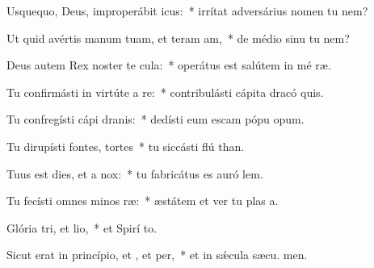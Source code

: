 \item Usquequo, Deus, improperábit icus:~* irrítat adversárius nomen tu  nem?
\item Ut quid avértis manum tuam, et teram am,~* de médio sinu tu  nem?
\item Deus autem Rex noster te cula:~* operátus est salútem in mé ræ.
\item Tu confirmásti in virtúte a re:~* contribulásti cápita dracó  quis.
\item Tu confregísti cápi dranis:~* dedísti eum escam pópu opum.
\item Tu dirupísti fontes,  tortes~* tu siccásti flú than.
\item Tuus est dies, et a  nox:~* tu fabricátus es auró  lem.
\item Tu fecísti omnes minos ræ:~* æstátem et ver tu plas a.
\item Glória tri, et lio,~* et Spirí to.
\item Sicut erat in princípio, et , et per,~* et in sǽcula sæcu. men.

